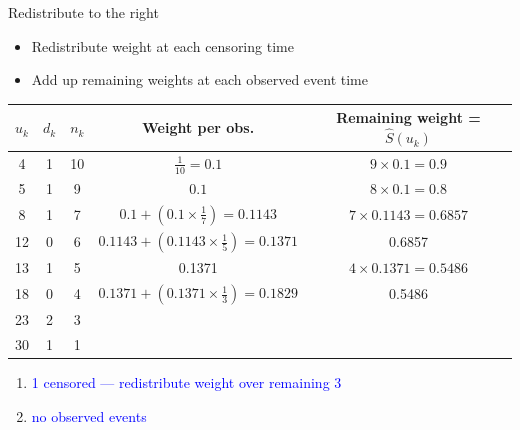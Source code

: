 \documentclass[10pt,t]{beamer}
\begin{document}
\begin{frame}{Redistribute to the right}
	\begin{itemize}
		\item Redistribute weight at each censoring time
		\item Add up remaining weights at each observed event time
	\end{itemize}
	\begin{footnotesize}
		\begin{tabular}{|c|c|c|c|c|}
			\hline
			$u_k$ & $d_k$ & $n_k$ & Weight per obs. & Remaining weight = $\widehat{S}(u_k)$ \\
			\hline
			4 & 1 & 10 & $\frac{1}{10} = 0.1$ & $9\times 0.1= 0.9$\\
			5 & 1 & 9 & $0.1$ &  $8\times 0.1= 0.8$  \\
			8 & 1 & 7 & $0.1 + (0.1\times \frac{1}{7}) = 0.1143$ & $7 \times 0.1143 = 0.6857$\\
			12 & 0 & 6 & $0.1143 +  (0.1143\times\frac{1}{5}) = 0.1371$ &  0.6857\\
			13 & 1 & 5 & 0.1371 & $4 \times 0.1371 =0.5486 $\\
			18 & 0 & 4 & $0.1371 + (0.1371\times \frac{1}{3}) = 0.1829$ & 0.5486\\
			23 & 2 & 3 & & \\
			30 & 1 & 1 & & \\
			\hline
		\end{tabular}
	\end{footnotesize}
	\begin{enumerate}
		\item \textcolor{blue}{1 censored --- redistribute weight over remaining 3}
		\item \textcolor{blue}{no observed events}
	\end{enumerate}
\end{frame}
\end{document}
